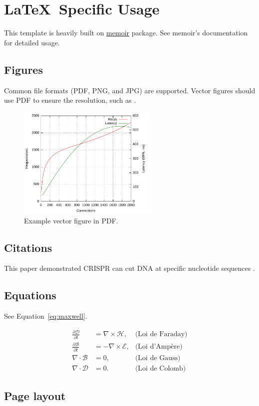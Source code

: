 \chapter{{\LaTeX}\ Specific Usage}

This template is heavily built on \href{https://www.ctan.org/pkg/memoir}{memoir} package. See memoir's documentation for detailed usage.

\section{Figures}
Common file formats (PDF, PNG, and JPG) are supported. Vector figures should use PDF to ensure the resolution, such as .

\begin{figure}[tbh]
  \centering
  \includegraphics[width=0.6\textwidth]{figures/just-a-plot}
  \caption{Example vector figure in PDF.}
  \label{fig:vector}
\end{figure}


\section{Citations}
This paper demonstrated CRISPR can cut DNA at specific nucleotide sequences \cite{Jinek2012}.


\section{Equations}
See Equation~\ref{eq:maxwell}.

\begin{equation}
    \label{eq:maxwell}
    \begin{aligned}
    \frac{\partial\mathcal{D}}{\partial t} & = \nabla\times\mathcal{H},   & \text{(Loi de Faraday)}\\
    \frac{\partial\mathcal{B}}{\partial t} & = -\nabla\times\mathcal{E},  & \text{(Loi d'Ampère)}\\
    \nabla\cdot\mathcal{B}                 & = 0,                         & \text{(Loi de Gauss)}\\
    \nabla\cdot\mathcal{D}                 & = 0.                         & \text{(Loi de Colomb)}
    \end{aligned}
\end{equation}

\clearpage
\section{Page layout}
\layout
